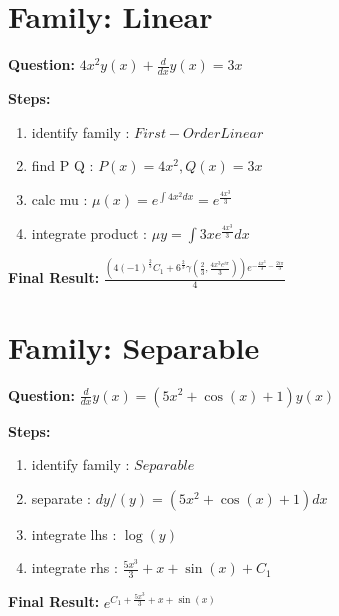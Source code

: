 \documentclass{article}
\begin{document}
\section*{Family: Linear}
\textbf{Question:} $4 x^{2} y{\left(x \right)} + \frac{d}{d x} y{\left(x \right)} = 3 x$

\textbf{Steps:}
\begin{enumerate}
\item identify family :  $First-Order Linear$
\item find P Q :  $P(x)=4 x^{2}, Q(x)=3 x$
\item calc mu :  $\mu(x) = e^{\int 4 x^{2} dx} = e^{\frac{4 x^{3}}{3}}$
\item integrate product :  $\mu y = \int 3 x e^{\frac{4 x^{3}}{3}} dx$
\end{enumerate}
\textbf{Final Result:} $\frac{\left(4 \left(-1\right)^{\frac{2}{3}} C_{1} + 6^{\frac{2}{3}} \gamma\left(\frac{2}{3}, \frac{4 x^{3} e^{i \pi}}{3}\right)\right) e^{- \frac{4 x^{3}}{3} - \frac{2 i \pi}{3}}}{4}$

\section*{Family: Separable}
\textbf{Question:} $\frac{d}{d x} y{\left(x \right)} = \left(5 x^{2} + \cos{\left(x \right)} + 1\right) y{\left(x \right)}$

\textbf{Steps:}
\begin{enumerate}
\item identify family :  $Separable$
\item separate :  $dy / (y) = (5 x^{2} + \cos{\left(x \right)} + 1) dx$
\item integrate lhs :  $\log{\left(y \right)}$
\item integrate rhs :  $\frac{5 x^{3}}{3} + x + \sin{\left(x \right)} + C_1$
\end{enumerate}
\textbf{Final Result:} $e^{C_{1} + \frac{5 x^{3}}{3} + x + \sin{\left(x \right)}}$
\end{document}
